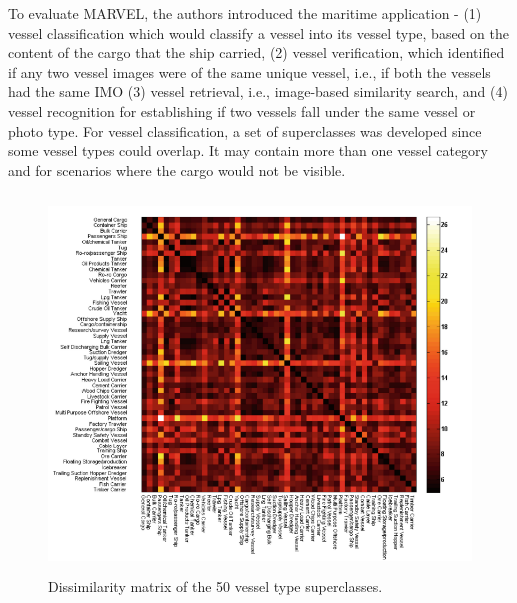 To evaluate MARVEL, the authors introduced the maritime application - (1) vessel classification which would classify a vessel into its vessel type, based on the content of the cargo that the ship carried, (2) vessel verification, which identified if any two vessel images were of the same unique vessel, i.e., if both the vessels had the same IMO (3) vessel retrieval, i.e., image-based similarity search, and (4) vessel recognition for establishing if two vessels fall under the same vessel or photo type. For vessel classification, a set of superclasses was developed since some vessel types could overlap. It may contain more than one vessel category and for scenarios where the cargo would not be visible.
\begin{figure}[H]
    \centering
    \includegraphics[width=\textwidth,height=10cm,keepaspectratio=true]{src/Images/marvel_diss_matrix.PNG}
    \caption{
     Dissimilarity matrix of the 50 vessel type superclasses\cite{gundogdu2017marvel}. 
     }
\end{figure}
\\

